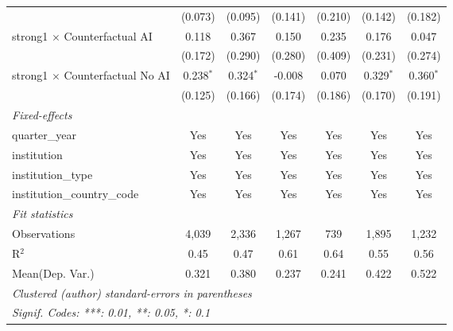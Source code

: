 \begin{tabular}{lcccccc}
                                          & (0.073)       & (0.095)       & (0.141)     & (0.210) & (0.142)     & (0.182)\\   
   strong1 $\times$ Counterfactual AI     & 0.118         & 0.367         & 0.150       & 0.235   & 0.176       & 0.047\\   
                                          & (0.172)       & (0.290)       & (0.280)     & (0.409) & (0.231)     & (0.274)\\   
   strong1 $\times$ Counterfactual No AI  & 0.238$^{*}$   & 0.324$^{*}$   & -0.008      & 0.070   & 0.329$^{*}$ & 0.360$^{*}$\\   
                                          & (0.125)       & (0.166)       & (0.174)     & (0.186) & (0.170)     & (0.191)\\   
   \midrule
   \emph{Fixed-effects}\\
   quarter\_year                          & Yes           & Yes           & Yes         & Yes     & Yes         & Yes\\  
   institution                            & Yes           & Yes           & Yes         & Yes     & Yes         & Yes\\  
   institution\_type                      & Yes           & Yes           & Yes         & Yes     & Yes         & Yes\\  
   institution\_country\_code             & Yes           & Yes           & Yes         & Yes     & Yes         & Yes\\  
   \midrule
   \emph{Fit statistics}\\
   Observations                           & 4,039         & 2,336         & 1,267       & 739     & 1,895       & 1,232\\  
   R$^2$                                  & 0.45          & 0.47          & 0.61        & 0.64    & 0.55        & 0.56\\  
Mean(Dep. Var.) & 0.321 & 0.380 & 0.237 & 0.241 & 0.422 & 0.522 \\
   \midrule \midrule
   \multicolumn{7}{l}{\emph{Clustered (author) standard-errors in parentheses}}\\
   \multicolumn{7}{l}{\emph{Signif. Codes: ***: 0.01, **: 0.05, *: 0.1}}\\
\end{tabular}
\par\endgroup
